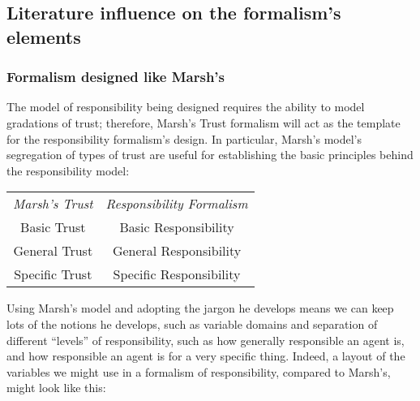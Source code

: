 \subsection{Literature influence on the formalism's elements}
\subsubsection{Formalism designed like Marsh's}
The model of responsibility being designed requires the ability to model gradations of trust; therefore, Marsh's Trust formalism will act as the template for the responsibility formalism's design. In particular, Marsh's model's segregation of types of trust are useful for establishing the basic principles behind the responsibility model:

{\centering
\begin{tabular}{c|c}
    \emph{Marsh's Trust} & \emph{Responsibility Formalism}\\
    Basic Trust & Basic Responsibility\\
    General Trust & General Responsibility\\
    Specific Trust & Specific Responsibility\\
\end{tabular}
    }

Using Marsh's model and adopting the jargon he develops means we can keep lots of the notions he develops, such as variable domains and separation of different ``levels'' of responsibility, such as how generally responsible an agent is, and how responsible an agent is for a very specific thing. Indeed, a layout of the variables we might use in a formalism of responsibility, compared to Marsh's, might look like this:

